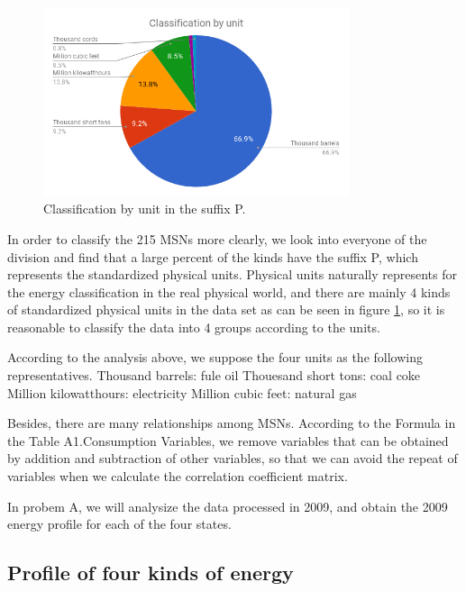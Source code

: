 \documentclass[a4paper,11pt]{article}
\begin{document}
\begin{figure}[!h]%
    \centering 
    \includegraphics[width=0.8\textwidth]{./Pic/classification_by_unit.png}
    \caption{Classification by unit in the suffix P.}
    \label{fig:classification_by_unit}  
\end{figure}

\par In order to classify the 215 MSNs more clearly, we look into everyone of the division and find that a large percent of the kinds have the suffix P, which represents the standardized physical units. Physical units naturally represents for the energy classification in the real physical world, and there are mainly 4 kinds of standardized physical units in the data set as can be seen in figure \ref{fig:classification_by_unit}, so it is reasonable to classify the data into 4 groups according to the units.
\par According to the analysis above, we suppose the four units as the following representatives.
Thousand barrels: fule oil
Thouesand short tons: coal coke
Million kilowatthours: electricity
Million cubic feet: natural gas
\par Besides, there are many relationships among MSNs. According to the Formula in the Table A1.Consumption Variables,\cite{4} we remove variables that can be obtained by addition and subtraction of other variables, so that we can avoid the repeat of variables when we calculate the correlation coefficient matrix. 
\par In probem A, we will analysize the data processed in 2009, and obtain the 2009 energy profile for each of the four states.

\subsection{Profile of four kinds of energy}
\end{document}
